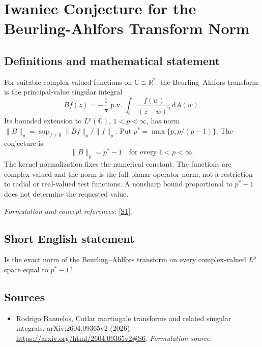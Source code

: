 \documentclass[11pt]{article}
\begin{document}
\section*{\texorpdfstring{Iwaniec Conjecture for the Beurling-Ahlfors Transform Norm}{Iwaniec Conjecture for the Beurling-Ahlfors Transform Norm}}\label{357}
\subsection{Definitions and mathematical statement}
For suitable complex-valued functions on ${\mathbb{C}}\cong{\mathbb{R}}^2$, the Beurling--Ahlfors transform is the principal-value singular integral
\[
 Bf(z)=-\frac1\pi\operatorname{p.v.}\int_{{\mathbb{C}}}
 \frac{f(w)}{(z-w)^2}{\,\mathrm{d}} A(w).
\]
Its bounded extension to $L^p({\mathbb{C}})$, $1<p<\infty$, has norm $\|B\|_p=\sup_{f\ne0}\|Bf\|_p/\|f\|_p$. Put $p^*=\max\{p,p/(p-1)\}$. The conjecture is
\[
 \|B\|_p=p^*-1\quad\text{for every }1<p<\infty.
\]
The kernel normalization fixes the numerical constant. The functions are complex-valued and the norm is the full planar operator norm, not a restriction to radial or real-valued test functions. A nonsharp bound proportional to $p^*-1$ does not determine the requested value.
\par\smallskip\textit{Formulation and concept references:} \href{https://arxiv.org/html/2604.09365v2#S6}{[S1]}.

\subsection{Short English statement}
Is the exact norm of the Beurling--Ahlfors transform on every complex-valued $L^p$ space equal to $p^*-1$?
\subsection{Sources}
\begin{itemize}
\item[S1]Rodrigo Banuelos, Cotlar martingale transforms and related singular integrals, arXiv:2604.09365v2 (2026).
\url{https://arxiv.org/html/2604.09365v2#S6}.
\textit{Formulation source.}
\end{itemize}
\end{document}

